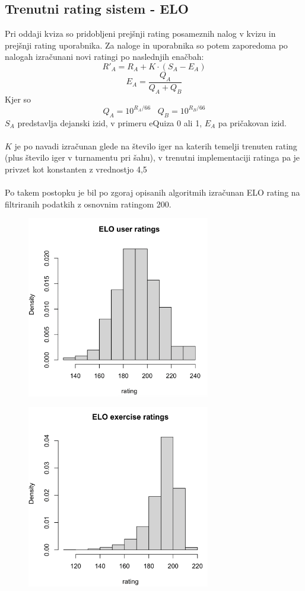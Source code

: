 \documentclass{IEEEtran}
\makeatletter
\let\old@subsection\subsection
\renewcommand{\subsection}[1]{\bigskip\old@subsection{#1}\@afterindentfalse\@afterheading}
\makeatother
\begin{document}
\subsection{Trenutni rating sistem - ELO}
Pri oddaji kviza so pridobljeni prejšnji rating posameznih nalog v kvizu in prejšnji rating uporabnika. Za naloge in uporabnika so potem zaporedoma po nalogah izračunani novi ratingi po naslednjih enačbah:
\begin{equation}
    R'_{A}=R_{A}+K\cdot \left ( S_{A}-E_{A} \right )
\end{equation}
\begin{equation}
    E_{A}=\frac{Q_{A}}{Q_{A}+Q_{B}}
\end{equation}
Kjer so
\begin{equation}
    Q_{A}=10^{R_{A}/66}\;\;\;Q_{B}=10^{R_{B}/66}
\end{equation}
$S_{A}$ predstavlja dejanski izid, v primeru eQuiza 0 ali 1, $E_{A}$ pa pričakovan izid.
\hfill
\\
\\
$K$ je po navadi izračunan glede na število iger na katerih temelji trenuten rating (plus število iger v turnamentu pri šahu),
v trenutni implementaciji ratinga pa je privzet kot konstanten z vrednostjo 4,5
\hfill
\\
\\
Po takem postopku je bil po zgoraj opisanih algoritmih izračunan ELO rating na filtriranih podatkih z osnovnim ratingom 200.
\begin{figure}[h]
\includegraphics[width=8cm]{ComputedELO}
\end{figure}
\begin{figure}[h]
\includegraphics[width=8cm]{ComputedELOe}
\end{figure}
\end{document}
